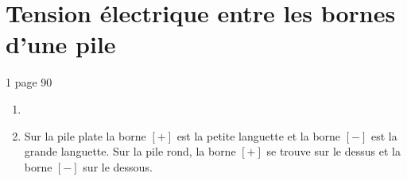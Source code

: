 \documentclass[12pt,a4paper]{article}
\begin{document}
	
	

\section{Tension électrique entre les bornes d'une pile}

\begin{myact}{1 page 90}
	\begin{enumerate}
		\item 
		\item Sur la pile plate la borne $[+]$ est la petite languette et la borne $[-]$ est la grande languette. Sur la pile rond, la borne $[+]$ se trouve sur le dessus et la borne $[-]$ sur le dessous.
		

\end{enumerate}
\end{myact}
\end{document}
